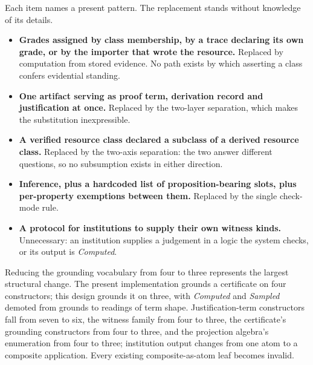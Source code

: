 \documentclass[manuscript,nonacm=true]{acmart}
\begin{document}
Each item names a present pattern. The replacement stands without knowledge of its details.

\begin{itemize}
\item \textbf{Grades assigned by class membership, by a trace declaring its own grade, or by the importer that wrote the resource.} Replaced by computation from stored evidence. No path exists by which asserting a class confers evidential standing.
\item \textbf{One artifact serving as proof term, derivation record and justification at once.} Replaced by the two-layer separation, which makes the substitution inexpressible.
\item \textbf{A verified resource class declared a subclass of a derived resource class.} Replaced by the two-axis separation: the two answer different questions, so no subsumption exists in either direction.
\item \textbf{Inference, plus a hardcoded list of proposition-bearing slots, plus per-property exemptions between them.} Replaced by the single check-mode rule.
\item \textbf{A protocol for institutions to supply their own witness kinds.} Unnecessary: an institution supplies a judgement in a logic the system checks, or its output is \emph{Computed}.
\end{itemize}

Reducing the grounding vocabulary from four to three represents the largest structural change. The present implementation grounds a certificate on four constructors; this design grounds it on three, with \emph{Computed} and \emph{Sampled} demoted from grounds to readings of term shape. Justification-term constructors fall from seven to six, the witness family from four to three, the certificate's grounding constructors from four to three, and the projection algebra's enumeration from four to three; institution output changes from one atom to a composite application. Every existing composite-as-atom leaf becomes invalid.
\end{document}

